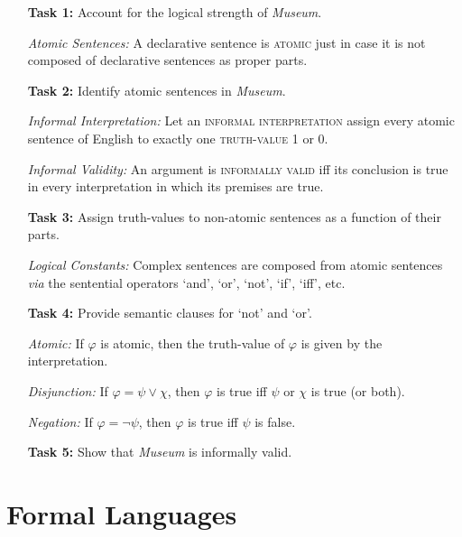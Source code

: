 \documentclass[a4paper, 11pt]{article} %
\begin{document}
\begin{enumerate}[leftmargin=1.2in,labelsep=.15in] %
  \item[\bf Task 1:] Account for the logical strength of \textit{Museum}.
  \item[\it Atomic Sentences:] A declarative sentence is \textsc{atomic} just in case it is not composed of declarative sentences as proper parts.
  \item[\bf Task 2:] Identify atomic sentences in \textit{Museum}.
  \item[\it Informal Interpretation:] Let an \textsc{informal interpretation} assign every atomic sentence of English to exactly one \textsc{truth-value} 1 or 0.
  \item[\it Informal Validity:] An argument is \textsc{informally valid} iff its conclusion is true in every interpretation in which its premises are true.
  \item[\bf Task 3:] Assign truth-values to non-atomic sentences as a function of their parts.
  \item[\it Logical Constants:] Complex sentences are composed from atomic sentences \textit{via} the sentential operators `and', `or', `not', `if', `iff', etc.
  \item[\bf Task 4:] Provide semantic clauses for `not' and `or'.
  \item[\it Atomic:] If $\varphi$ is atomic, then the truth-value of $\varphi$ is given by the interpretation. 
  \item[\it Disjunction:] If $\varphi=\psi\vee\chi$, then $\varphi$ is true iff $\psi$ or $\chi$ is true (or both). 
  \item[\it Negation:] If $\varphi=\neg\psi$, then $\varphi$ is true iff $\psi$ is false. 
  \item[\bf Task 5:] Show that \textit{Museum} is informally valid.
\end{enumerate}





\section*{Formal Languages}
\end{document}
